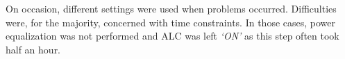 \documentclass[a4paper,12pt]{article}
\begin{document}
                                                                                                                                                                                                                                                                                                                                                                                                                                                                                                                                                                                                                                                                                                                                                                                                                                                                                                                                                                                                                                                                                                                                                                                                                                                                                                                                                                                                                                                                                                                                                                                                                                                                                                                                                                                                                                                                                                                                                                                                                                                                                                                                                                                                                                                                                                                                                                                                                                                                                                                                                                                                                                                                                                                   On occasion, different settings were used when problems occurred. Difficulties were, for the majority, concerned with time constraints. In those cases, power equalization was not performed and ALC was left \emph{‘ON’} as this step often took half an hour.    
\end{document}
